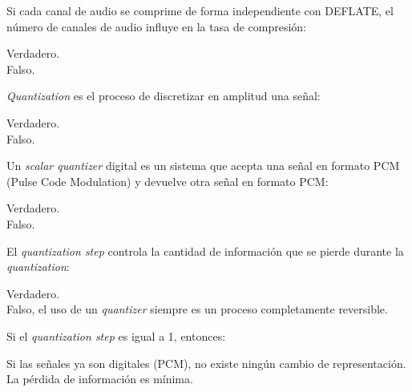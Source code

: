 \documentclass[legalpaper, 12pt, addpoints]{exam}
\begin{document}
\begin{questions}
\question Si cada canal de audio se comprime de forma
independiente con DEFLATE, el número de canales de audio influye en la tasa de compresión:

\begin{oneparchoices}
  \choice Verdadero.\\
  \choice Falso.
\end{oneparchoices}
  
\vspace{0.10in}

\question \emph{Quantization} es el proceso de discretizar en amplitud una señal:

\begin{oneparchoices}
  \choice Verdadero.\\
  \choice Falso.
\end{oneparchoices}
  
\vspace{0.10in}

\question Un \emph{scalar quantizer} digital es un sistema que acepta una señal
en formato PCM (Pulse Code Modulation) y devuelve otra señal en formato PCM:

\begin{oneparchoices}
  \choice Verdadero.\\
  \choice Falso.
\end{oneparchoices}
  
\vspace{0.10in}

\question El \emph{quantization step} controla la cantidad de información que se pierde durante la \emph{quantization}:

\begin{oneparchoices}
  \choice Verdadero.\\
  \choice Falso, el uso de un \emph{quantizer} siempre es un proceso completamente reversible.
\end{oneparchoices}
  
\vspace{0.10in}

\question Si el \emph{quantization step} es igual a 1, entonces:

\begin{oneparchoices}
  \choice Si las señales ya son digitales (PCM), no existe ningún cambio de representación.\\
  \choice La pérdida de información es mínima.
\end{oneparchoices}
  
\vspace{0.10in}


\end{questions}
\end{document}
